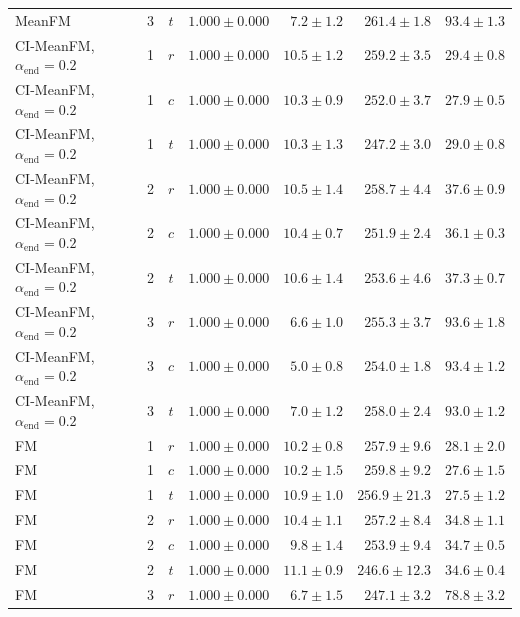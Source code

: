 \begin{table}[htpb]
\begin{tabularx}{\linewidth}{@{}L r c rrrr@{}}
    MeanFM & 3 & $t$ & $1.000 \pm 0.000$ & $7.2 \pm 1.2$ & $261.4 \pm 1.8$ & $93.4 \pm 1.3$ \\
    \addlinespace[2pt]
    CI-MeanFM, $\alpha_{\mathrm{end}}=0.2$ & 1 & $r$ & $1.000 \pm 0.000$ & $10.5 \pm 1.2$ & $259.2 \pm 3.5$ & $29.4 \pm 0.8$ \\
    CI-MeanFM, $\alpha_{\mathrm{end}}=0.2$ & 1 & $c$ & $1.000 \pm 0.000$ & $10.3 \pm 0.9$ & $252.0 \pm 3.7$ & $27.9 \pm 0.5$ \\
    CI-MeanFM, $\alpha_{\mathrm{end}}=0.2$ & 1 & $t$ & $1.000 \pm 0.000$ & $10.3 \pm 1.3$ & $247.2 \pm 3.0$ & $29.0 \pm 0.8$ \\
    \addlinespace[2pt]
    CI-MeanFM, $\alpha_{\mathrm{end}}=0.2$ & 2 & $r$ & $1.000 \pm 0.000$ & $10.5 \pm 1.4$ & $258.7 \pm 4.4$ & $37.6 \pm 0.9$ \\
    CI-MeanFM, $\alpha_{\mathrm{end}}=0.2$ & 2 & $c$ & $1.000 \pm 0.000$ & $10.4 \pm 0.7$ & $251.9 \pm 2.4$ & $36.1 \pm 0.3$ \\
    CI-MeanFM, $\alpha_{\mathrm{end}}=0.2$ & 2 & $t$ & $1.000 \pm 0.000$ & $10.6 \pm 1.4$ & $253.6 \pm 4.6$ & $37.3 \pm 0.7$ \\
    \addlinespace[2pt]
    CI-MeanFM, $\alpha_{\mathrm{end}}=0.2$ & 3 & $r$ & $1.000 \pm 0.000$ & $6.6 \pm 1.0$ & $255.3 \pm 3.7$ & $93.6 \pm 1.8$ \\
    CI-MeanFM, $\alpha_{\mathrm{end}}=0.2$ & 3 & $c$ & $1.000 \pm 0.000$ & $5.0 \pm 0.8$ & $254.0 \pm 1.8$ & $93.4 \pm 1.2$ \\
    CI-MeanFM, $\alpha_{\mathrm{end}}=0.2$ & 3 & $t$ & $1.000 \pm 0.000$ & $7.0 \pm 1.2$ & $258.0 \pm 2.4$ & $93.0 \pm 1.2$ \\
    \addlinespace[2pt]
    FM & 1 & $r$ & $1.000 \pm 0.000$ & $10.2 \pm 0.8$ & $257.9 \pm 9.6$ & $28.1 \pm 2.0$ \\
    FM & 1 & $c$ & $1.000 \pm 0.000$ & $10.2 \pm 1.5$ & $259.8 \pm 9.2$ & $27.6 \pm 1.5$ \\
    FM & 1 & $t$ & $1.000 \pm 0.000$ & $10.9 \pm 1.0$ & $256.9 \pm 21.3$ & $27.5 \pm 1.2$ \\
    \addlinespace[2pt]
    FM & 2 & $r$ & $1.000 \pm 0.000$ & $10.4 \pm 1.1$ & $257.2 \pm 8.4$ & $34.8 \pm 1.1$ \\
    FM & 2 & $c$ & $1.000 \pm 0.000$ & $9.8 \pm 1.4$ & $253.9 \pm 9.4$ & $34.7 \pm 0.5$ \\
    FM & 2 & $t$ & $1.000 \pm 0.000$ & $11.1 \pm 0.9$ & $246.6 \pm 12.3$ & $34.6 \pm 0.4$ \\
    \addlinespace[2pt]
    FM & 3 & $r$ & $1.000 \pm 0.000$ & $6.7 \pm 1.5$ & $247.1 \pm 3.2$ & $78.8 \pm 3.2$ \\

\end{tabularx}
\end{table}
